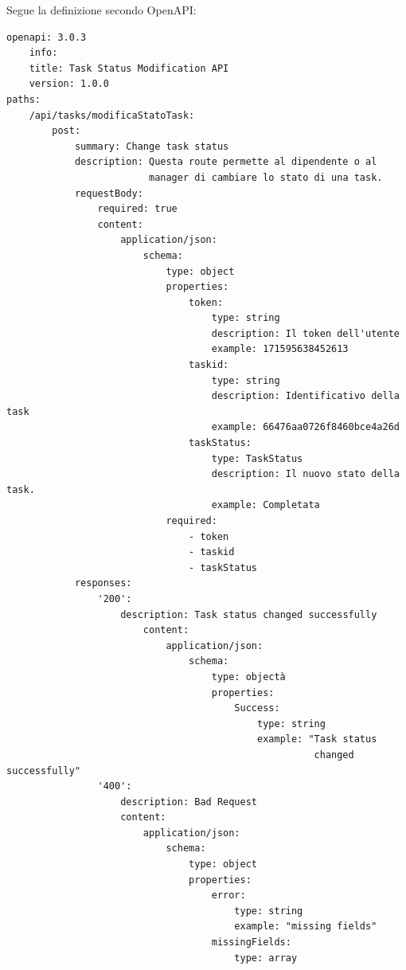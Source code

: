\documentclass{report}
\begin{document}
Segue la definizione secondo OpenAPI:

\begin{verbatim}
openapi: 3.0.3
    info:
    title: Task Status Modification API
    version: 1.0.0
paths:
    /api/tasks/modificaStatoTask:
        post:
            summary: Change task status
            description: Questa route permette al dipendente o al
                         manager di cambiare lo stato di una task.
            requestBody:
                required: true
                content:
                    application/json:
                        schema:
                            type: object
                            properties:
                                token:
                                    type: string
                                    description: Il token dell'utente
                                    example: 171595638452613
                                taskid:
                                    type: string
                                    description: Identificativo della task
                                    example: 66476aa0726f8460bce4a26d
                                taskStatus:
                                    type: TaskStatus
                                    description: Il nuovo stato della task.
                                    example: Completata
                            required:
                                - token
                                - taskid
                                - taskStatus
            responses:
                '200':
                    description: Task status changed successfully
                        content:
                            application/json:
                                schema:
                                    type: objectà
                                    properties:
                                        Success:
                                            type: string
                                            example: "Task status
                                                      changed successfully"
                '400':
                    description: Bad Request
                    content:
                        application/json:
                            schema:
                                type: object
                                properties:
                                    error:
                                        type: string
                                        example: "missing fields"
                                    missingFields:
                                        type: array

\end{verbatim}
\end{document}
